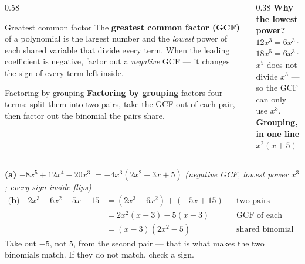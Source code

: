 \documentclass[aspectratio=169, 11pt]{beamer}
\begin{document}
\begin{frame}[t, plain]
  \begin{columns}[T]
    \begin{column}{0.58\textwidth}
      \begin{block}{Greatest common factor}
        The \textbf{greatest common factor (GCF)} of a polynomial is the largest number and the
        \emph{lowest} power of each shared variable that divide every term. When the leading
        coefficient is negative, factor out a \emph{negative} GCF --- it changes the sign of
        every term left inside.
      \end{block}
      \vspace{2pt}
      \begin{block}{Factoring by grouping}
        \textbf{Factoring by grouping} factors four terms: split them into two pairs, take the
        GCF out of each pair, then factor out the binomial the pairs share.
      \end{block}
    \end{column}
    \begin{column}{0.38\textwidth}
      \centering
      \textbf{Why the lowest power?}\\[6pt]
      $12x^3=6x^3\cdot 2$\\[2pt]
      $18x^5=6x^3\cdot 3x^2$\\[8pt]
      {\scriptsize $x^5$ does not divide $x^3$ --- so the GCF can only use $x^3$.}\\[10pt]
      \textbf{Grouping, in one line}\\[4pt]
      {\small $x^2(x+5)+3(x+5)=(x+5)(x^2+3)$}
    \end{column}
  \end{columns}
\end{frame}

\begin{frame}[t, plain]
  \textbf{(a)} $-8x^5+12x^4-20x^3$ \pause $=-4x^3(2x^2-3x+5)$ \quad
  \emph{(negative GCF, lowest power $x^3$; every sign inside flips)}
  \pause
  \[
  \begin{aligned}
    \textbf{(b)}\quad 2x^3-6x^2-5x+15 &= (2x^3-6x^2)+(-5x+15) && \text{two pairs} \\
                                      &= 2x^2(x-3)-5(x-3)      && \text{GCF of each pair} \\
                                      &= (x-3)(2x^2-5)         && \text{shared binomial}
  \end{aligned}
  \]
  \pause
  {\small Take out $-5$, not $5$, from the second pair --- that is what makes the two binomials
  match. If they do not match, check a sign.}
\end{frame}
\end{document}
